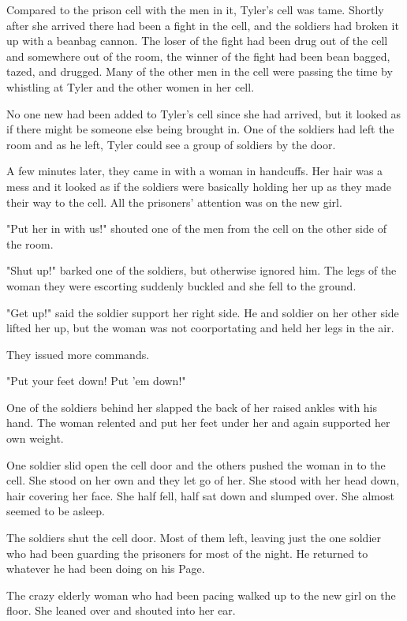 \documentclass[courier]{sffms}
\begin{document}
Compared to the prison cell with the men in it, Tyler's
cell was tame. Shortly after she arrived there had been
a fight in the cell, and the soldiers had broken it up with
a beanbag cannon. The loser of the fight had been drug
out of the cell and somewhere out of the room, the
winner of the fight had been bean bagged, tazed, and
drugged. Many of the other men in the cell were passing
the time by whistling at Tyler and the other women in
her cell.

No one new had been added to Tyler's cell since she
had arrived, but it looked as if there might be someone
else being brought in. One of the soldiers had left the
room and as he left, Tyler could see a group of soldiers
by the door.

A few minutes later, they came in with a woman in 
handcuffs. Her hair was a mess and it looked as if
the soldiers were basically holding her up as they
made their way to the cell. All the prisoners' attention
was on the new girl.

"Put her in with us!" shouted one of the men from the
cell on the other side of the room.

"Shut up!" barked one of the soldiers, but otherwise
ignored him. The legs of the woman they were escorting
suddenly buckled and she fell to the ground.

"Get up!" said the soldier support her right side. He and
soldier on her other side lifted her up, but the woman
was not coorportating and held her legs in the air.

They issued more commands.

"Put your feet down! Put 'em down!"

One of the soldiers behind her slapped the back of her
raised ankles with his hand. The woman relented and
put her feet under her and again supported her own
weight.

One soldier slid open the cell door and the others pushed
the woman in to the cell. She stood on her own and they
let go of her. She stood with her head down, hair covering
her face. She half fell, half sat down and slumped over. She
almost seemed to be asleep.

The soldiers shut the cell door. Most of them left, leaving
just the one soldier who had been guarding the prisoners
for most of the night. He returned to whatever he had
been doing on his Page.

The crazy elderly woman who had been pacing walked up
to the new girl on the floor. She leaned over and shouted
into her ear.
\end{document}
